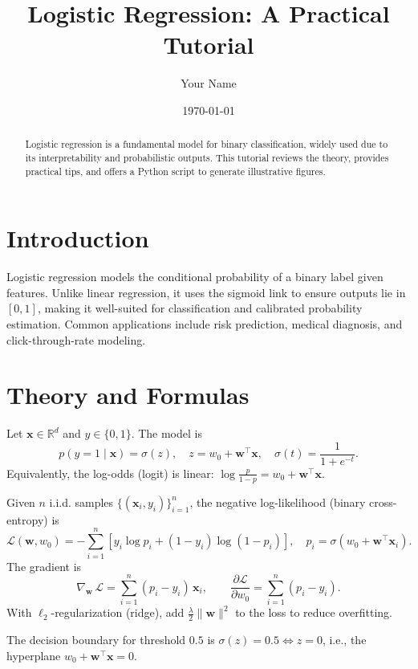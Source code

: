 \documentclass[11pt,a4paper]{article}
\title{Logistic Regression: A Practical Tutorial}
\author{Your Name}
\date{\today}
\begin{document}
\maketitle

\begin{abstract}
Logistic regression is a fundamental model for binary classification, widely used due to its interpretability and probabilistic outputs. This tutorial reviews the theory, provides practical tips, and offers a Python script to generate illustrative figures.
\end{abstract}

\section{Introduction}
Logistic regression models the conditional probability of a binary label given features. Unlike linear regression, it uses the sigmoid link to ensure outputs lie in $[0,1]$, making it well-suited for classification and calibrated probability estimation. Common applications include risk prediction, medical diagnosis, and click-through-rate modeling.

\section{Theory and Formulas}
Let $\bm{x} \in \mathbb{R}^d$ and $y \in \{0,1\}$. The model is
\begin{equation}
  p(y=1\mid \bm{x}) = \sigma(z), \quad z = w_0 + \bm{w}^\top \bm{x}, \quad \sigma(t) = \frac{1}{1+e^{-t}}.
\end{equation}
Equivalently, the log-odds (logit) is linear: $\log \frac{p}{1-p} = w_0 + \bm{w}^\top \bm{x}$.

Given $n$ i.i.d. samples $\{(\bm{x}_i,y_i)\}_{i=1}^n$, the negative log-likelihood (binary cross-entropy) is
\begin{equation}
  \mathcal{L}(\bm{w},w_0) = -\sum_{i=1}^n \left[ y_i \log p_i + (1-y_i)\log (1-p_i)\right],\quad p_i = \sigma(w_0+\bm{w}^\top\bm{x}_i).
\end{equation}
The gradient is
\begin{equation}
  \nabla_{\bm{w}}\, \mathcal{L} = \sum_{i=1}^n (p_i - y_i)\,\bm{x}_i, \qquad \frac{\partial \mathcal{L}}{\partial w_0} = \sum_{i=1}^n (p_i - y_i).
\end{equation}
With $\ell_2$-regularization (ridge), add $\tfrac{\lambda}{2}\lVert \bm{w}\rVert^2$ to the loss to reduce overfitting.

The decision boundary for threshold $0.5$ is $\sigma(z)=0.5 \iff z = 0$, i.e., the hyperplane $w_0 + \bm{w}^\top\bm{x} = 0$.
\end{document}
